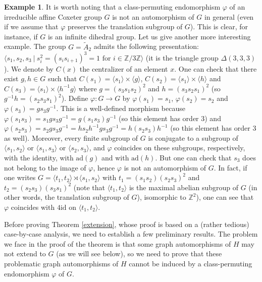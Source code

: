 \documentclass[a4paper, 11pt]{amsart}
\theoremstyle{definition}
\newtheorem{ex}[te]{Example}
\theoremstyle{remark}
\begin{document}
\begin{ex}\label{example2}
It is worth noting that a class-permuting endomorphism $\varphi$ of an irreducible affine Coxeter group $G$ is not an automorphism of $G$ in general (even if we assume that $\varphi$ preserves the translation subgroup of $G$). This is clear, for instance, if $G$ is an infinite dihedral group. Let us give another more interesting example. The group $G=\tilde{A} _2$ admits the following presentation: $\langle s_1,s_2,s_3 \ \vert \ s_i^2=(s_is_{i+1})^3=1 \text{ for } i\in\mathbb{Z}/3\mathbb{Z} \rangle$ (it is the triangle group $\Delta(3,3,3)$). We denote by $C(x)$ the centralizer of an element $x$. One can check that there exist $g,h\in G$ such that $C(s_1)=\langle s_1\rangle\times \langle g\rangle$, $C(s_2)=\langle s_1\rangle\times \langle h\rangle$ and $C(s_3)=\langle s_1\rangle\times \langle h^{-1}g\rangle$ where $g=(s_3s_1s_2)^2$ and $h=(s_3s_2s_1)^2$ (so $g^{-1}h=(s_2s_3s_1)^2$). Define $\varphi : G\rightarrow G$ by $\varphi(s_1)=s_1$, $\varphi(s_2)=s_2$ and $\varphi(s_3)=gs_3g^{-1}$. This is a well-defined morphism because $\varphi(s_1s_3)=s_1gs_3g^{-1}=g(s_1s_3)g^{-1}$ (so this element has order 3) and $\varphi(s_2s_3)=s_2gs_3g^{-1}=hs_2h^{-1}gs_3g^{-1}=h(s_2s_3)h^{-1}$ (so this element has order 3 as well). Moreover, every finite subgroup of $G$ is conjugate to a subgroup of $\langle s_1,s_2\rangle$ or $\langle s_1,s_3\rangle$ or $\langle s_2,s_3\rangle$, and $\varphi$ coincides on these subgroups, respectively, with the identity, with $\mathrm{ad}(g)$ and with $\mathrm{ad}(h)$. But one can check that $s_3$ does not belong to the image of $\varphi$, hence $\varphi$ is not an automorphism of $G$. In fact, if one writes $G=\langle t_1,t_2\rangle\rtimes \langle s_1,s_2\rangle$ with $t_1=(s_1s_2)(s_2s_3)^2$ and $t_2=(s_2s_3)(s_3s_1)^2$ (note that $\langle t_1,t_2\rangle$ is the maximal abelian subgroup of $G$ (in other words, the translation subgroup of $G$), isomorphic to $\mathbb{Z}^2$), one can see that $\varphi$ coincides with $4\mathrm{id}$ on $\langle t_1,t_2\rangle$.\end{ex}

Before proving Theorem \ref{extension}, whose proof is based on a (rather tedious) case-by-case analysis, we need to establish a few preliminary results. The problem we face in the proof of the theorem is that some graph automorphisms of $H$ may not extend to $G$ (as we will see below), so we need to prove that these problematic graph automorphisms of $H$ cannot be induced by a class-permuting endomorphism $\varphi$ of $G$. 
\end{document}
